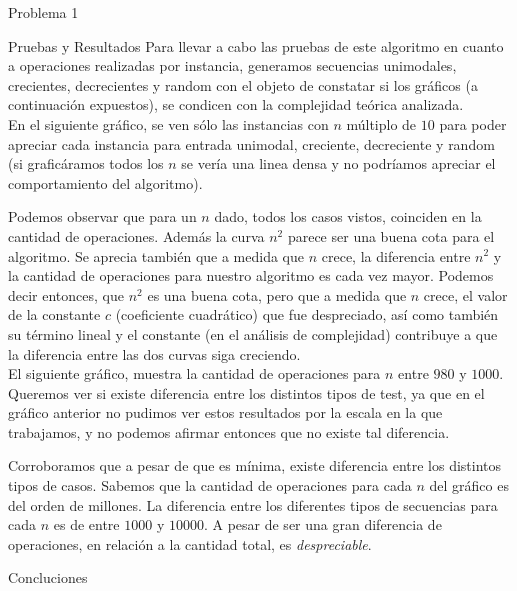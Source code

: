 \begin{section}{Problema 1}
\begin{subsection}{Pruebas y Resultados}
		Para llevar a cabo las pruebas de este algoritmo en cuanto a operaciones realizadas por instancia, generamos secuencias unimodales, crecientes, decrecientes y random con el objeto de constatar si los gráficos (a continuación expuestos), se condicen con la complejidad teórica analizada.\\

		En el siguiente gráfico, se ven sólo las instancias con $n$ múltiplo de $10$ para poder apreciar cada instancia para entrada unimodal, creciente, decreciente y random (si graficáramos todos los $n$ se vería una linea densa y no podríamos apreciar el comportamiento del algoritmo).

		
		Podemos observar que para un $n$ dado, todos los casos vistos, coinciden en la cantidad de operaciones. Además la curva $n^2$ parece ser una buena cota para el algoritmo. Se aprecia también que a medida que $n$ crece, la diferencia entre $n^2$ y la cantidad de operaciones para nuestro algoritmo es cada vez mayor. Podemos decir entonces, que $n^2$ es una buena cota, pero que a medida que $n$ crece, el valor de la constante $c$ (coeficiente cuadrático) que fue despreciado, así como también su término lineal y el constante  (en el análisis de complejidad) contribuye a que la diferencia entre las dos curvas siga creciendo.\\

		El siguiente gráfico, muestra la cantidad de operaciones para $n$ entre $980$ y $1000$. Queremos ver si existe diferencia entre los distintos tipos de test, ya que en el gráfico anterior no pudimos ver estos resultados por la escala en la que trabajamos, y no podemos afirmar entonces que no existe tal diferencia.\\


		\newpage

		Corroboramos que a pesar de que es mínima, existe diferencia entre los distintos tipos de casos. Sabemos que la cantidad de operaciones para cada $n$ del gráfico es del orden de millones. La diferencia entre los diferentes tipos de secuencias para cada $n$ es de entre $1000$ y $10000$. A pesar de ser una gran diferencia de operaciones, en relación a la cantidad total, es {\em despreciable}.

	\end{subsection}

	\begin{subsection}{Concluciones}


\end{subsection}
\end{section}
